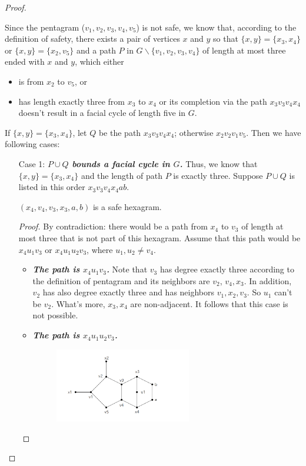 \begin{proof}
\begin{itemize}
\end{itemize}
Since the pentagram ($v_1, v_2, v_3, v_4, v_5$) is not safe, we know that, according to the definition of safety, there exists a pair of vertices $x$ and $y$ so that $\{x, y\} = \{x_3, x_4\}$ or $\{x, y\} = \{x_2, v_5\}$ and a path $P$ in $G \backslash \{v_1, v_2, v_3, v_4\}$ of length at most three ended with $x$ and $y$, which either 
\begin{itemize}
    \item is from $x_2$ to $v_5$, or
    \item has length exactly three from $x_3$ to $x_4$ or its completion via the path $x_3v_3v_4x_4$ doesn't result in a facial cycle of length five in $G$.
\end{itemize}
If $\{x, y\} = \{x_3, x_4\}$, let $Q$ be the path $x_3v_3v_4x_4$; otherwise $x_2v_2v_1v_5$. Then we have following cases:
\begin{itemize}
    \item[Case 1:] \textit{\textbf{$P \cup Q$ bounds a facial cycle in $G$.}} Thus, we know that $\{x, y\} = \{x_3, x_4\}$ and the length of path $P$ is exactly three. Suppose $P \cup Q$ is listed in this order $x_3v_3v_4x_4ab$.
    \begin{claim}
    $(x_4, v_4, v_3, x_3, a, b)$ is a safe hexagram. 
    \end{claim}
    \begin{proof}
    By contradiction: there would be a path from $x_4$ to $v_3$ of length at most three that is not part of this hexagram. Assume that this path would be $x_4u_1v_3$ or $x_4u_1u_2v_3$, where $u_1, u_2 \ne v_4$.
    \begin{itemize}
        \item \textit{\textbf{The path is $x_4u_1v_3$.}} Note that $v_3$ has degree exactly three according to the definition of pentagram and its neighbors are $v_2$, $v_4, x_3$. In addition, $v_2$ has also degree exactly three and has neighbors $v_1, x_2, v_3$. So $u_1$ can't be $v_2$. What's more, $x_3, x_4$ are non-adjacent. It follows that this case is not possible.
        \item \textit{\textbf{The path is $x_4u_1u_2v_3$.}} 
        \begin{figure}[H] %
            \centering %
            \includegraphics[width=0.6\textwidth]{figure/pcupqboundsaface.png} 

\end{figure}
\end{itemize}
\end{proof}
\end{itemize}
\end{proof}
